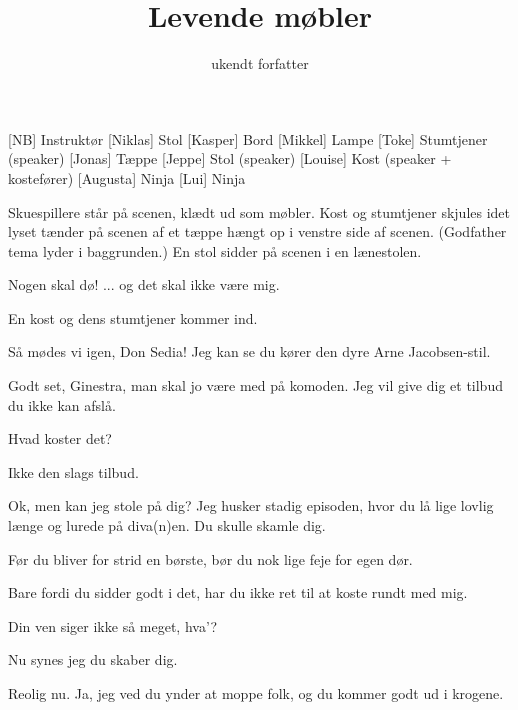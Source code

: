 \documentclass[a4paper,11pt]{article}
\title{Levende møbler}
\author{ukendt forfatter}
\begin{document}
\maketitle

\begin{roles}
[NB] Instruktør
[Niklas] Stol
[Kasper] Bord
[Mikkel] Lampe
[Toke] Stumtjener (speaker)
[Jonas] Tæppe
[Jeppe] Stol (speaker)
[Louise] Kost (speaker + kostefører)
[Augusta] Ninja
[Lui] Ninja
\end{roles}




\begin{sketch}
\scene Skuespillere står på scenen, klædt ud som møbler. Kost og stumtjener skjules idet lyset tænder på scenen af et tæppe hængt op i venstre side af scenen.
    (Godfather tema lyder i baggrunden.) 
    \scene En stol sidder på scenen i en  lænestolen.
    
     Nogen skal dø! ... og det skal ikke være mig.
    
    \scene En kost og dens stumtjener kommer ind.
    
     Så mødes vi igen, Don Sedia! Jeg kan se du kører den dyre Arne
    Jacobsen-stil.
    
     Godt set, Ginestra, man skal jo være med på komoden. Jeg vil give dig et tilbud du ikke kan afslå.
    
     Hvad koster det? 
    
     Ikke den slags tilbud.
    
     Ok, men kan jeg stole på dig? Jeg husker stadig episoden, hvor
    du lå lige lovlig længe og lurede på diva(n)en. Du skulle skamle dig.
    
     Før du bliver for strid en børste, bør du nok lige feje for egen dør.
    
     Bare fordi du sidder godt i det, har du ikke ret til at koste rundt med
    mig.
    
     Din ven siger ikke så meget, hva’?
    
     Nu synes jeg du skaber dig.
    
     Reolig nu. Ja, jeg ved du ynder at moppe folk, og du kommer godt ud
    i krogene.
    

\end{sketch}
\end{document}
